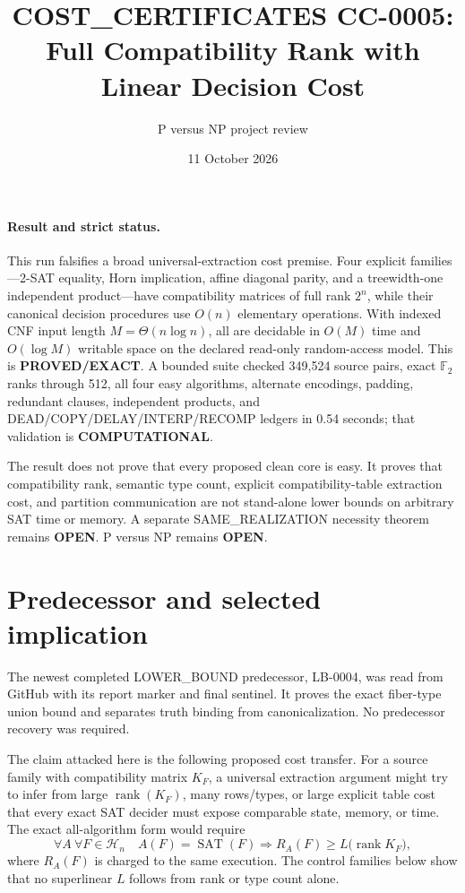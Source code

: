 \documentclass[11pt]{article}
\title{COST\_CERTIFICATES CC-0005:\\Full Compatibility Rank with Linear Decision Cost}
\author{P versus NP project review}
\date{11 October 2026}
\begin{document}
\maketitle

\paragraph{Result and strict status.}
This run falsifies a broad universal-extraction cost premise.  Four explicit
families---2-SAT equality, Horn implication, affine diagonal parity, and a
treewidth-one independent product---have compatibility matrices of full rank
$2^n$, while their canonical decision procedures use $O(n)$ elementary
operations.  With indexed CNF input length $M=\Theta(n\log n)$, all are
decidable in $O(M)$ time and $O(\log M)$ writable space on the declared
read-only random-access model.  This is \textbf{PROVED/EXACT}.  A bounded
suite checked 349,524 source pairs, exact $\mathbb F_2$ ranks through 512,
all four easy algorithms, alternate encodings, padding, redundant clauses,
independent products, and DEAD/COPY/DELAY/INTERP/RECOMP ledgers in 0.54
seconds; that validation is \textbf{COMPUTATIONAL}.

The result does not prove that every proposed clean core is easy.  It proves
that compatibility rank, semantic type count, explicit compatibility-table
extraction cost, and partition communication are not stand-alone lower bounds
on arbitrary SAT time or memory.  A separate SAME\_REALIZATION necessity
theorem remains \textbf{OPEN}.  P versus NP remains \textbf{OPEN}.

\section{Predecessor and selected implication}
The newest completed LOWER\_BOUND predecessor, LB-0004, was read from GitHub
with its report marker and final sentinel.  It proves the exact fiber-type
union bound and separates truth binding from canonicalization.  No predecessor
recovery was required.

The claim attacked here is the following proposed cost transfer.  For a
source family with compatibility matrix $K_F$, a universal extraction argument
might try to infer from large $\operatorname{rank}(K_F)$, many rows/types, or
large explicit table cost that every exact SAT decider must expose comparable
state, memory, or time.  The exact all-algorithm form would require
\[
 \forall A\ \forall F\in\mathcal H_n\quad
 A(F)=\operatorname{SAT}(F)
 \Longrightarrow
 R_A(F)\ge L\bigl(\operatorname{rank}K_F\bigr),
\]
where $R_A(F)$ is charged to the same execution.  The control families below
show that no superlinear $L$ follows from rank or type count alone.
\end{document}
